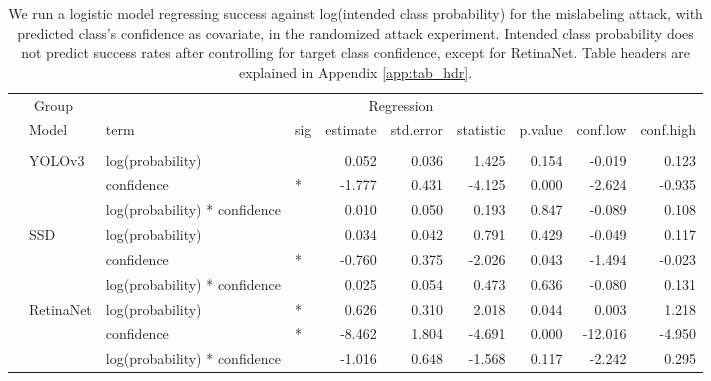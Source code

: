 \begin{longtable}[t]{llllrrrrrr}
\caption{\label{tab:mislabel_conf_table}We run a logistic model regressing success against log(intended class probability) for the mislabeling attack, with predicted class's confidence as covariate, in the randomized attack experiment. Intended class probability does not predict success rates after controlling for target class confidence, except for RetinaNet. Table headers are explained in Appendix \ref{app:tab_hdr}.}\\
\toprule
\multicolumn{2}{c}{Group} & \multicolumn{8}{c}{Regression} \\
\cmidrule(l{3pt}r{3pt}){1-2} \cmidrule(l{3pt}r{3pt}){3-10}
 & Model & term & sig & estimate & std.error & statistic & p.value & conf.low & conf.high\\
\midrule
\addlinespace[0.3em]
\multicolumn{10}{l}{\textbf{Mislabeling}}\\
\hspace{1em} & YOLOv3 & log(probability) &  & 0.052 & 0.036 & 1.425 & 0.154 & -0.019 & 0.123\\
\cmidrule{3-10}\nopagebreak
\hspace{1em} &  & confidence & * & -1.777 & 0.431 & -4.125 & 0.000 & -2.624 & -0.935\\
\cmidrule{3-10}\nopagebreak
\hspace{1em} &  & log(probability) * confidence &  & 0.010 & 0.050 & 0.193 & 0.847 & -0.089 & 0.108\\
\cmidrule{2-10}\nopagebreak
\hspace{1em} & SSD & log(probability) &  & 0.034 & 0.042 & 0.791 & 0.429 & -0.049 & 0.117\\
\cmidrule{3-10}\nopagebreak
\hspace{1em} &  & confidence & * & -0.760 & 0.375 & -2.026 & 0.043 & -1.494 & -0.023\\
\cmidrule{3-10}\nopagebreak
\hspace{1em} &  & log(probability) * confidence &  & 0.025 & 0.054 & 0.473 & 0.636 & -0.080 & 0.131\\
\cmidrule{2-10}\nopagebreak
\hspace{1em} & RetinaNet & log(probability) & * & 0.626 & 0.310 & 2.018 & 0.044 & 0.003 & 1.218\\
\cmidrule{3-10}\nopagebreak
\hspace{1em} &  & confidence & * & -8.462 & 1.804 & -4.691 & 0.000 & -12.016 & -4.950\\
\cmidrule{3-10}\nopagebreak
\hspace{1em} &  & log(probability) * confidence &  & -1.016 & 0.648 & -1.568 & 0.117 & -2.242 & 0.295\\

\end{longtable}
